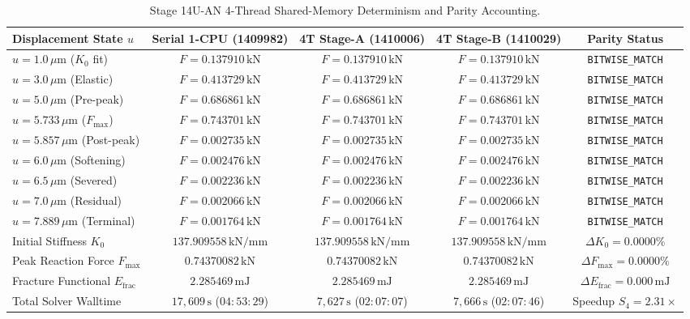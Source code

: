 \begin{table}[htbp]
\centering
\small
\caption{Stage 14U-AN 4-Thread Shared-Memory Determinism and Parity Accounting.}
\label{tab:stage14uan_determinism_accounting}
\begin{tabularx}{\textwidth}{l c c c c}
\toprule
\textbf{Displacement State $u$} & \textbf{Serial 1-CPU (1409982)} & \textbf{4T Stage-A (1410006)} & \textbf{4T Stage-B (1410029)} & \textbf{Parity Status} \\
\midrule
$u = 1.0\,\mu\mathrm{m}$ ($K_0$ fit) & $F = 0.137910\,\mathrm{kN}$ & $F = 0.137910\,\mathrm{kN}$ & $F = 0.137910\,\mathrm{kN}$ & \texttt{BITWISE\_MATCH} \\
$u = 3.0\,\mu\mathrm{m}$ (Elastic)   & $F = 0.413729\,\mathrm{kN}$ & $F = 0.413729\,\mathrm{kN}$ & $F = 0.413729\,\mathrm{kN}$ & \texttt{BITWISE\_MATCH} \\
$u = 5.0\,\mu\mathrm{m}$ (Pre-peak)  & $F = 0.686861\,\mathrm{kN}$ & $F = 0.686861\,\mathrm{kN}$ & $F = 0.686861\,\mathrm{kN}$ & \texttt{BITWISE\_MATCH} \\
$u = 5.733\,\mu\mathrm{m}$ ($F_{\max}$) & $F = 0.743701\,\mathrm{kN}$ & $F = 0.743701\,\mathrm{kN}$ & $F = 0.743701\,\mathrm{kN}$ & \texttt{BITWISE\_MATCH} \\
$u = 5.857\,\mu\mathrm{m}$ (Post-peak)& $F = 0.002735\,\mathrm{kN}$ & $F = 0.002735\,\mathrm{kN}$ & $F = 0.002735\,\mathrm{kN}$ & \texttt{BITWISE\_MATCH} \\
$u = 6.0\,\mu\mathrm{m}$ (Softening) & $F = 0.002476\,\mathrm{kN}$ & $F = 0.002476\,\mathrm{kN}$ & $F = 0.002476\,\mathrm{kN}$ & \texttt{BITWISE\_MATCH} \\
$u = 6.5\,\mu\mathrm{m}$ (Severed)   & $F = 0.002236\,\mathrm{kN}$ & $F = 0.002236\,\mathrm{kN}$ & $F = 0.002236\,\mathrm{kN}$ & \texttt{BITWISE\_MATCH} \\
$u = 7.0\,\mu\mathrm{m}$ (Residual)  & $F = 0.002066\,\mathrm{kN}$ & $F = 0.002066\,\mathrm{kN}$ & $F = 0.002066\,\mathrm{kN}$ & \texttt{BITWISE\_MATCH} \\
$u = 7.889\,\mu\mathrm{m}$ (Terminal)& $F = 0.001764\,\mathrm{kN}$ & $F = 0.001764\,\mathrm{kN}$ & $F = 0.001764\,\mathrm{kN}$ & \texttt{BITWISE\_MATCH} \\
\midrule
Initial Stiffness $K_0$ & $137.909558\,\mathrm{kN/mm}$ & $137.909558\,\mathrm{kN/mm}$ & $137.909558\,\mathrm{kN/mm}$ & $\Delta K_0 = 0.0000\%$ \\
Peak Reaction Force $F_{\max}$ & $0.74370082\,\mathrm{kN}$ & $0.74370082\,\mathrm{kN}$ & $0.74370082\,\mathrm{kN}$ & $\Delta F_{\max} = 0.0000\%$ \\
Fracture Functional $E_{\mathrm{frac}}$ & $2.285469\,\mathrm{mJ}$ & $2.285469\,\mathrm{mJ}$ & $2.285469\,\mathrm{mJ}$ & $\Delta E_{\mathrm{frac}} = 0.000\,\mathrm{mJ}$ \\
Total Solver Walltime & $17{,}609\,\mathrm{s}$ ($04:53:29$) & $7{,}627\,\mathrm{s}$ ($02:07:07$) & $7{,}666\,\mathrm{s}$ ($02:07:46$) & Speedup $S_4 = 2.31\times$ \\
\bottomrule
\end{tabularx}
\end{table}

